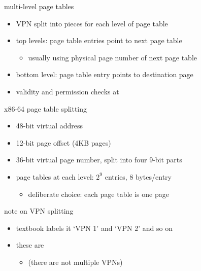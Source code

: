 \begin{frame}{multi-level page tables}
    \begin{itemize}
    \item VPN split into pieces for each level of page table
    \vspace{.5cm}
    \item top levels: page table entries point to next page table
        \begin{itemize}
        \item usually using physical page number of next page table
        \end{itemize}
    \item bottom level: page table entry points to destination page
    \vspace{.5cm}
    \item validity and permission checks at 
    \end{itemize}
\end{frame}

\begin{frame}{x86-64 page table splitting}
    \begin{itemize}
    \item 48-bit virtual address
    \item 12-bit page offset (4KB pages)
    \item 36-bit virtual page number, split into four 9-bit parts
    \item page tables at each level: $2^9$ entries, 8 bytes/entry
        \begin{itemize}
        \item deliberate choice: each page table is one page
        \end{itemize}
    \end{itemize}
\end{frame}

\begin{frame}{note on VPN splitting}
    \begin{itemize}
    \item textbook labels it `VPN 1' and `VPN 2' and so on
    \item these are 
        \begin{itemize}
        \item (there are not multiple VPNs)
        \end{itemize}
    \end{itemize}
\end{frame}
